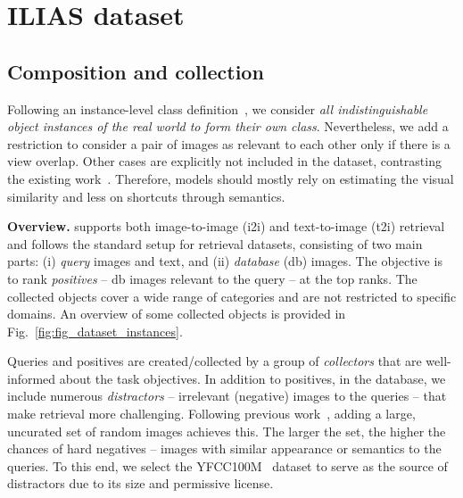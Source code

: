 \section{ILIAS dataset}
\label{sec:ilias}

\begin{figure*}[t]
  \centering
  \scalebox{0.83}{
    
  }
  \vspace{-21pt}
  \caption{\textbf{Examples of query, positive and hard negatives within the distractor set.} Average Precision per query and rank of the negatives and positives is reported using SigLIP~\cite{siglip} model. {\color{lightblue}\textbf{Gray:}} queries. {\color{lightgreen}\textbf{Green:}} positives. {\color{lightred}\textbf{Red:}} distractors.
  \label{fig:fig_dataset_instances}
  \vspace{-16pt}
  }
\end{figure*}

\subsection{Composition and collection}
\label{sec:composition}

 Following an instance-level class definition~\cite{rit+18,ygg+21}, we consider \emph{all indistinguishable object instances of the real world to form their own class}. 
Nevertheless, we add a restriction to consider a pair of images as relevant to each other only if there is a view overlap. Other cases are explicitly not included in the dataset, contrasting the existing work~\cite{liu2016deepfashion,sxj+15,wac+20}. Therefore, models should mostly rely on estimating the visual similarity and less on shortcuts through semantics.

\noindent\textbf{Overview.}
\ours supports both image-to-image (i2i) and text-to-image (t2i) retrieval and follows the standard setup for retrieval datasets, consisting of two main parts: (i) \emph{query} images and text, and (ii) \emph{database} (db) images. The objective is to rank \emph{positives} -- db images relevant to the query -- at the top ranks. 
The collected objects cover a wide range of categories and are not restricted to specific domains. An overview of some collected objects is provided in Fig.~\ref{fig:fig_dataset_instances}.

Queries and positives are created/collected by a group of \emph{collectors} that are well-informed about the task objectives. 
In addition to positives, in the database, we include numerous \emph{distractors} -- irrelevant (negative) images to the queries -- that make retrieval more challenging. Following previous work~\cite{rit+18}, adding a large, uncurated set of random images achieves this. The larger the set, the higher the chances of hard negatives -- images with similar appearance or semantics to the queries. To this end, we select the YFCC100M~\cite{tsf+16} dataset to serve as the source of distractors due to its size and permissive license.

